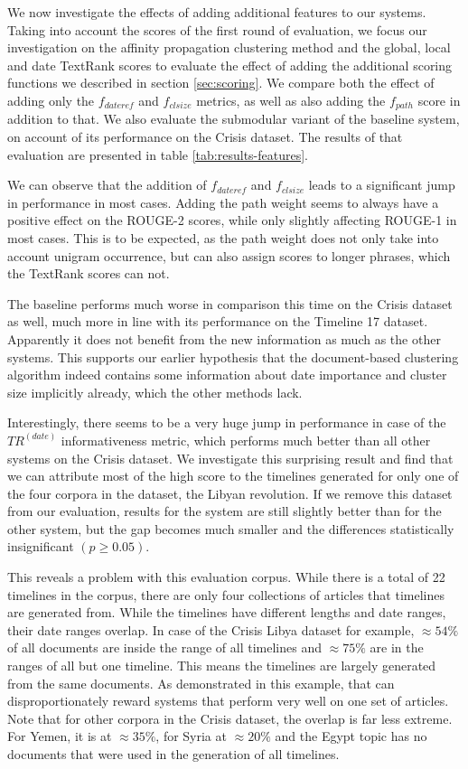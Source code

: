 \documentclass[a4paper,BCOR=10mm]{report}
\numberwithin{lemma}{chapter}
\numberwithin{definition}{chapter}
\begin{document}
We now investigate the effects of adding additional features to our systems.
Taking into account the scores of the first round of evaluation, we focus our investigation on the affinity propagation clustering method and the global, local and date TextRank scores to evaluate the effect of adding the additional scoring functions we described in section \ref{sec:scoring}.
We compare both the effect of adding only the $f_{dateref}$ and $f_{clsize}$ metrics, as well as also adding the $f_{path}$ score in addition to that. We also evaluate the submodular variant of the baseline system, on account of its performance on the Crisis dataset.
The results of that evaluation are presented in table \ref{tab:results-features}.

We can observe that the addition of $f_{dateref}$ and $f_{clsize}$ leads to a significant jump in performance in most cases.
Adding the path weight seems to always have a positive effect on the ROUGE-2 scores, while only slightly affecting ROUGE-1 in most cases.
This is to be expected, as the path weight does not only take into account unigram occurrence, but can also assign scores to longer phrases, which the TextRank scores can not.

The baseline performs much worse in comparison this time on the Crisis dataset as well, much more in line with its performance on the Timeline 17 dataset. Apparently it does not benefit from the new information as much as the other systems. This supports our earlier hypothesis that the document-based clustering algorithm indeed contains some information about date importance and cluster size implicitly already, which the other methods lack.

Interestingly, there seems to be a very huge jump in performance in case of the $TR^{(date)}$ informativeness metric, which performs much better than all other systems on the Crisis dataset. We investigate this surprising result and find that we can attribute most of the high score to the timelines generated for only one of the four corpora in the dataset, the Libyan revolution.
If we remove this dataset from our evaluation, results for the system are still slightly better than for the other system, but the gap becomes much smaller and the differences statistically insignificant $(p \geq 0.05)$.

This reveals a problem with this evaluation corpus. While there is a total of 22 timelines in the corpus, there are only four collections of articles that timelines are generated from. While the timelines have different lengths and date ranges, their date ranges overlap. In case of the Crisis Libya dataset for example, $\approx 54\%$ of all documents are inside the range of all timelines and $\approx 75\%$ are in the ranges of all but one timeline. This means the timelines are largely generated from the same documents. As demonstrated in this example, that can disproportionately reward systems that perform very well on one set of articles.
Note that for other corpora in the Crisis dataset, the overlap is far less extreme.
For Yemen, it is at $\approx 35\%$, for Syria at $\approx 20\%$ and the Egypt topic has no documents that were used in the generation of all timelines.
\end{document}
